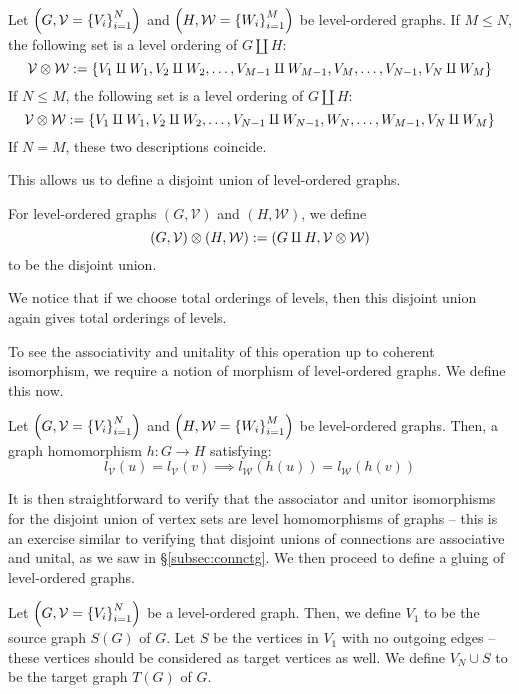 \documentclass[./Thick_TQFTs_and_Quantum_Information.tex]{subfiles}
\begin{document}
\begin{cor}
Let $\br{G, \mathcal{V} = \set{V_i}_{i = 1}^{N}}$ and
$\br{H, \mathcal{W} = \set{W_i}_{i = 1}^{M}}$ be level-ordered
graphs. If $M \leq N$, the following set is a level ordering of $G \amalg H$:
\[
  \mathcal{V} \tensor \mathcal{W} :=
  \set{V_1 \amalg W_1, V_2 \amalg W_2, \dots, V_{M - 1} \amalg W_{M - 1},
  V_M, \dots, V_{N - 1}, V_N \amalg W_M}
\]
If $N \leq M$, the following set is a level ordering of $G \amalg H$:
\[
  \mathcal{V} \tensor \mathcal{W} :=
  \set{V_1 \amalg W_1, V_2 \amalg W_2, \dots, V_{N - 1} \amalg W_{N - 1},
  W_N, \dots, W_{M - 1}, V_N \amalg W_M}
\]
If $N = M$, these two descriptions coincide.
\end{cor}

This allows us to define a disjoint union of level-ordered graphs.
\begin{defn}
For level-ordered graphs $(G, \mathcal{V})$ and $(H, \mathcal{W})$, we define
\[
  (G, \mathcal{V}) \otimes (H, \mathcal{W}) :=
    (G \amalg H, \mathcal{V} \otimes \mathcal{W})
\]
to be the disjoint union.
\end{defn}

\begin{rmk}
We notice that if we choose total orderings of levels, then this disjoint union
again gives total orderings of levels.
\end{rmk}

To see the associativity and unitality of this operation up to coherent
isomorphism, we require a notion of morphism of level-ordered graphs. We
define this now.

\begin{defn}
Let $\br{G, \mathcal{V} = \set{V_i}_{i = 1}^{N}}$ and
$\br{H, \mathcal{W} = \set{W_i}_{i = 1}^{M}}$ be level-ordered
graphs. Then, a graph homomorphism $h : G \to H$ satisfying:
\[
  l_{\mathcal{V}}(u) = l_{\mathcal{V}}(v)
  \implies l_{\mathcal{W}}(h(u)) = l_{\mathcal{W}}(h(v))
\]
\end{defn}

It is then straightforward to verify that the associator and unitor isomorphisms
for the disjoint union of vertex sets are level homomorphisms of graphs -- this
is an exercise similar to verifying that disjoint unions of connections are
associative and unital, as we saw in \S\ref{subsec:connctg}. We then proceed to
define a gluing of level-ordered graphs.

\begin{defn}
Let $\br{G, \mathcal{V} = \set{V_i}_{i = 1}^{N}}$ be a level-ordered graph.
Then, we define $V_1$ to be the source graph $S(G)$ of $G$. Let $S$ be the
vertices in $V_1$ with no outgoing edges -- these vertices should be considered
as target vertices as well. We define $V_N \cup S$ to be the target graph $T(G)$
of $G$.
\end{defn}
\end{document}
